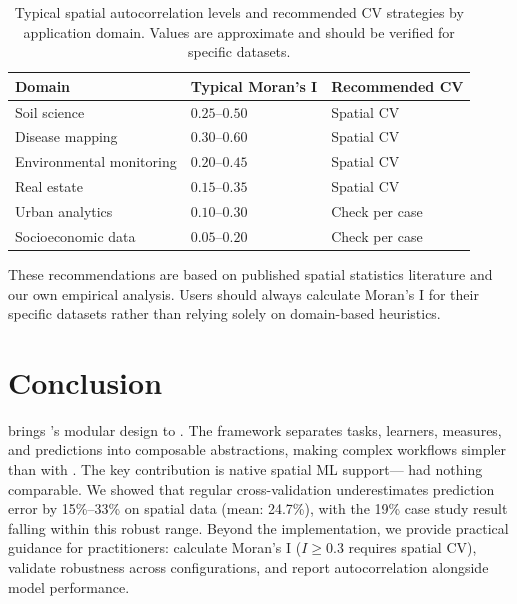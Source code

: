 \documentclass[article]{jss}
\begin{document}
\begin{table}[ht]
\centering
\begin{tabular}{lll}
\toprule
Domain & Typical Moran's I & Recommended CV \\
\midrule
Soil science & $0.25$--$0.50$ & Spatial CV \\
Disease mapping & $0.30$--$0.60$ & Spatial CV \\
Environmental monitoring & $0.20$--$0.45$ & Spatial CV \\
Real estate & $0.15$--$0.35$ & Spatial CV \\
Urban analytics & $0.10$--$0.30$ & Check per case \\
Socioeconomic data & $0.05$--$0.20$ & Check per case \\
\bottomrule
\end{tabular}
\caption{Typical spatial autocorrelation levels and recommended CV strategies by application domain. Values are approximate and should be verified for specific datasets.}
\label{tab:domains}
\end{table}

These recommendations are based on published spatial statistics literature \citep{brenning2012sperrorest, meyer2018CAST, valavi2019blockCV} and our own empirical analysis. Users should always calculate Moran's I for their specific datasets rather than relying solely on domain-based heuristics.



\section{Conclusion} \label{sec:conclusion}

 brings 's modular design to . The framework separates tasks, learners, measures, and predictions into composable abstractions, making complex workflows simpler than with . The key contribution is native spatial ML support--- had nothing comparable. We showed that regular cross-validation underestimates prediction error by 15\%--33\% on spatial data (mean: 24.7\%), with the 19\% case study result falling within this robust range. Beyond the implementation, we provide practical guidance for practitioners: calculate Moran's I ($I \geq 0.3$ requires spatial CV), validate robustness across configurations, and report autocorrelation alongside model performance.
\end{document}
